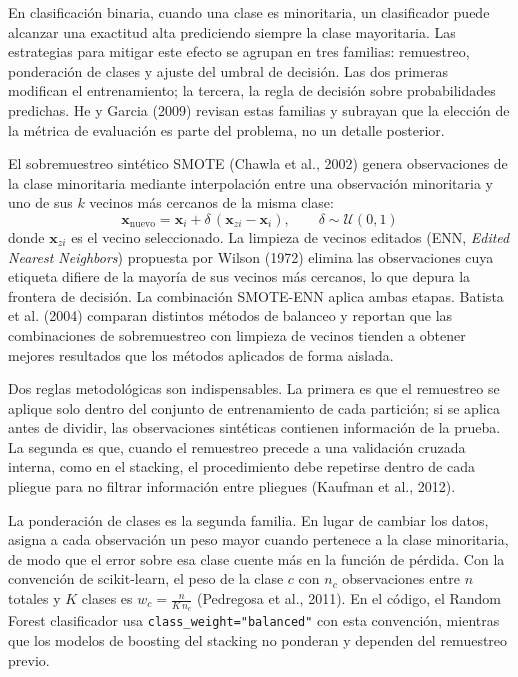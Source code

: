 En clasificación binaria, cuando una clase es minoritaria, un clasificador puede alcanzar una exactitud alta prediciendo siempre la clase mayoritaria. Las estrategias para mitigar este efecto se agrupan en tres familias: remuestreo, ponderación de clases y ajuste del umbral de decisión. Las dos primeras modifican el entrenamiento; la tercera, la regla de decisión sobre probabilidades predichas. He y Garcia (2009) revisan estas familias y subrayan que la elección de la métrica de evaluación es parte del problema, no un detalle posterior.

El sobremuestreo sintético SMOTE (Chawla et al., 2002) genera observaciones de la clase minoritaria mediante interpolación entre una observación minoritaria y uno de sus $k$ vecinos más cercanos de la misma clase:
\begin{equation}
\mathbf{x}_{\text{nuevo}} = \mathbf{x}_i + \delta\,(\mathbf{x}_{zi}-\mathbf{x}_i), \qquad \delta \sim \mathcal{U}(0,1)
\label{eq:smote}
\end{equation}
donde $\mathbf{x}_{zi}$ es el vecino seleccionado. La limpieza de vecinos editados (ENN, \textit{Edited Nearest Neighbors}) propuesta por Wilson (1972) elimina las observaciones cuya etiqueta difiere de la mayoría de sus vecinos más cercanos, lo que depura la frontera de decisión. La combinación SMOTE-ENN aplica ambas etapas. Batista et al. (2004) comparan distintos métodos de balanceo y reportan que las combinaciones de sobremuestreo con limpieza de vecinos tienden a obtener mejores resultados que los métodos aplicados de forma aislada.

Dos reglas metodológicas son indispensables. La primera es que el remuestreo se aplique solo dentro del conjunto de entrenamiento de cada partición; si se aplica antes de dividir, las observaciones sintéticas contienen información de la prueba. La segunda es que, cuando el remuestreo precede a una validación cruzada interna, como en el stacking, el procedimiento debe repetirse dentro de cada pliegue para no filtrar información entre pliegues (Kaufman et al., 2012).

La ponderación de clases es la segunda familia. En lugar de cambiar los datos, asigna a cada observación un peso mayor cuando pertenece a la clase minoritaria, de modo que el error sobre esa clase cuente más en la función de pérdida. Con la convención de scikit-learn, el peso de la clase $c$ con $n_c$ observaciones entre $n$ totales y $K$ clases es $w_c=\frac{n}{K\,n_c}$ (Pedregosa et al., 2011). En el código, el Random Forest clasificador usa \texttt{class\_weight="balanced"} con esta convención, mientras que los modelos de boosting del stacking no ponderan y dependen del remuestreo previo.


